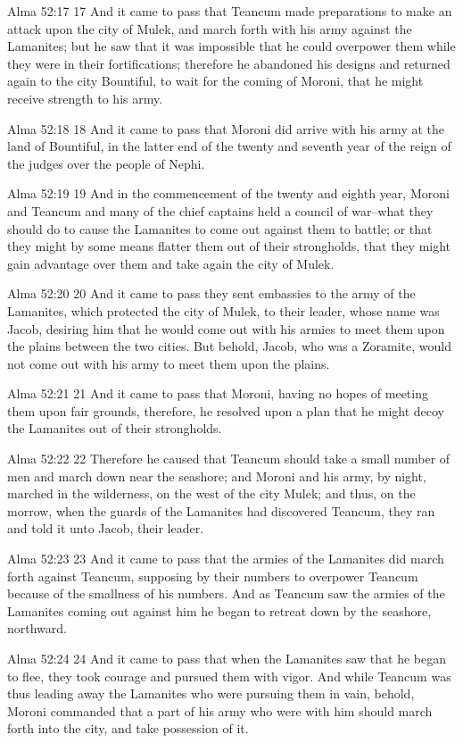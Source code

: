 Alma 52:17
 17 And it came to pass that Teancum made preparations to make an
attack upon the city of Mulek, and march forth with his army
against the Lamanites; but he saw that it was impossible that he
could overpower them while they were in their fortifications;
therefore he abandoned his designs and returned again to the city
Bountiful, to wait for the coming of Moroni, that he might
receive strength to his army.

Alma 52:18
 18 And it came to pass that Moroni did arrive with his army at
the land of Bountiful, in the latter end of the twenty and
seventh year of the reign of the judges over the people of Nephi.

Alma 52:19
 19 And in the commencement of the twenty and eighth year, Moroni
and Teancum and many of the chief captains held a council of
war--what they should do to cause the Lamanites to come out
against them to battle; or that they might by some means flatter
them out of their strongholds, that they might gain advantage
over them and take again the city of Mulek.

Alma 52:20
 20 And it came to pass they sent embassies to the army of the
Lamanites, which protected the city of Mulek, to their leader,
whose name was Jacob, desiring him that he would come out with
his armies to meet them upon the plains between the two cities.
But behold, Jacob, who was a Zoramite, would not come out with
his army to meet them upon the plains.

Alma 52:21
 21 And it came to pass that Moroni, having no hopes of meeting
them upon fair grounds, therefore, he resolved upon a plan that
he might decoy the Lamanites out of their strongholds.

Alma 52:22
 22 Therefore he caused that Teancum should take a small number
of men and march down near the seashore; and Moroni and his army,
by night, marched in the wilderness, on the west of the city
Mulek; and thus, on the morrow, when the guards of the Lamanites
had discovered Teancum, they ran and told it unto Jacob, their
leader.

Alma 52:23
 23 And it came to pass that the armies of the Lamanites did
march forth against Teancum, supposing by their numbers to
overpower Teancum because of the smallness of his numbers. And
as Teancum saw the armies of the Lamanites coming out against him
he began to retreat down by the seashore, northward.

Alma 52:24
 24 And it came to pass that when the Lamanites saw that he began
to flee, they took courage and pursued them with vigor. And
while Teancum was thus leading away the Lamanites who were
pursuing them in vain, behold, Moroni commanded that a part of
his army who were with him should march forth into the city, and
take possession of it.

